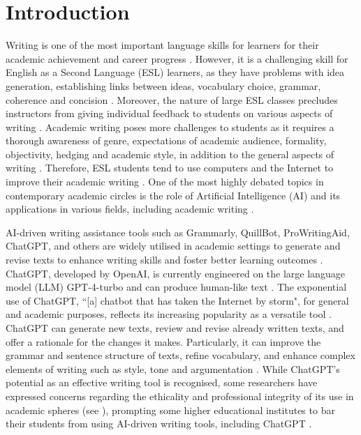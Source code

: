 \documentclass[english]{textolivre}
\begin{document}
\section{Introduction}
Writing is one of the most important language skills for learners for their academic achievement and career progress \cite{duong2025}. However, it is a challenging skill for English as a Second Language (ESL) learners, as they have problems with idea generation, establishing links between ideas, vocabulary choice, grammar, coherence and concision \cite{alkamel2024}. Moreover, the nature of large ESL classes precludes instructors from giving individual feedback to students on various aspects of writing \cite{mahapatra2024}. Academic writing poses more challenges to students as it requires a thorough awareness of genre, expectations of academic audience, formality, objectivity, hedging and academic style, in addition to the general aspects of writing \cite{barrot2023, klimova2024}. Therefore, ESL students tend to use computers and the Internet to improve their academic writing \cite{meniado2024, teng2024a}. One of the most highly debated topics in contemporary academic circles is the role of Artificial Intelligence (AI) and its applications in various fields, including academic writing \cite{alkamel2024, bekturova2025}.

AI-driven writing assistance tools such as Grammarly, QuillBot, ProWritingAid, ChatGPT, and others are widely utilised in academic settings to generate and revise texts to enhance writing skills and foster better learning outcomes \cite{bekturova2025, mahapatra2024, teng2024a}. ChatGPT, developed by OpenAI, is currently engineered on the large language model (LLM) GPT-4-turbo and can produce human-like text \cite{xue2023}. The exponential use of ChatGPT, ``[a] chatbot that has taken the Internet by storm", for general and academic purposes, reflects its increasing popularity as a versatile tool \cite[p. 1]{barrot2023}. ChatGPT can generate new texts, review and revise already written texts, and offer a rationale for the changes it makes. Particularly, it can improve the grammar and sentence structure of texts, refine vocabulary, and enhance complex elements of writing such as style, tone and argumentation \cite{imran2023chatgpt}. While ChatGPT’s potential as an effective writing tool is recognised, some researchers have expressed concerns regarding the ethicality and professional integrity of its use in academic spheres (see \textcite{alkamel2024, barrot2023, thorp2023chatgpt}), prompting some higher educational institutes to bar their students from using AI-driven writing tools, including ChatGPT \cite{teng2024b}.
\end{document}
